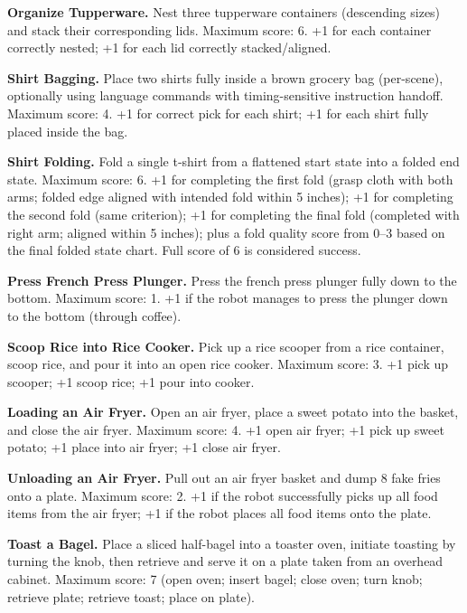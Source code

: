 \documentclass[conference]{IEEEtran}
\begin{document}
\noindent \textbf{Organize Tupperware.} Nest three tupperware containers (descending sizes) and stack their corresponding lids.
Maximum score: 6. +1 for each container correctly nested; +1 for each lid correctly stacked/aligned.

\noindent \textbf{Shirt Bagging.} Place two shirts fully inside a brown grocery bag (per-scene), optionally using language commands with timing-sensitive instruction handoff.
Maximum score: 4. +1 for correct pick for each shirt; +1 for each shirt fully placed inside the bag.

\noindent \textbf{Shirt Folding.} Fold a single t‑shirt from a flattened start state into a folded end state.
Maximum score: 6. +1 for completing the first fold (grasp cloth with both arms; folded edge aligned with intended fold within 5 inches); +1 for completing the second fold (same criterion); +1 for completing the final fold (completed with right arm; aligned within 5 inches); plus a fold quality score from 0–3 based on the final folded state chart. Full score of 6 is considered success.

\noindent \textbf{Press French Press Plunger.} Press the french press plunger fully down to the bottom.
Maximum score: 1. +1 if the robot manages to press the plunger down to the bottom (through coffee).

\noindent \textbf{Scoop Rice into Rice Cooker.} Pick up a rice scooper from a rice container, scoop rice, and pour it into an open rice cooker.
Maximum score: 3. +1 pick up scooper; +1 scoop rice; +1 pour into cooker.

\noindent \textbf{Loading an Air Fryer.} Open an air fryer, place a sweet potato into the basket, and close the air fryer.
Maximum score: 4. +1 open air fryer; +1 pick up sweet potato; +1 place into air fryer; +1 close air fryer.

\noindent \textbf{Unloading an Air Fryer.} Pull out an air fryer basket and dump 8 fake fries onto a plate. Maximum score: 2. +1 if the robot successfully picks up all food items from the air fryer; +1 if the robot places all food items onto the plate.

\noindent \textbf{Toast a Bagel.} Place a sliced half-bagel into a toaster oven, initiate toasting by turning the knob, then retrieve and serve it on a plate taken from an overhead cabinet.
Maximum score: 7 (open oven; insert bagel; close oven; turn knob; retrieve plate; retrieve toast; place on plate).
\end{document}
